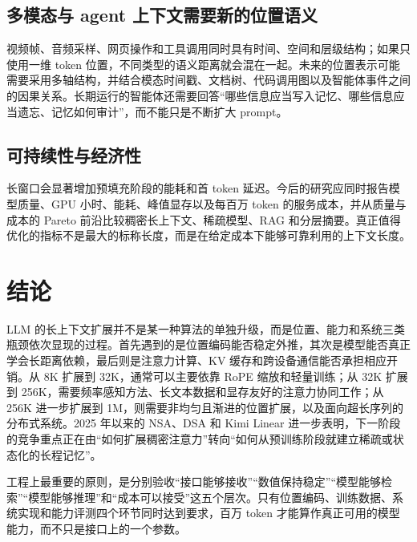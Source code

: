 \documentclass[UTF8,10pt,a4paper,fontset=none]{ctexart}
\begin{document}
\subsection{多模态与 agent 上下文需要新的位置语义}
视频帧、音频采样、网页操作和工具调用同时具有时间、空间和层级结构；如果只使用一维 token 位置，不同类型的语义距离就会混在一起。未来的位置表示可能需要采用多轴结构，并结合模态时间戳、文档树、代码调用图以及智能体事件之间的因果关系。长期运行的智能体还需要回答“哪些信息应当写入记忆、哪些信息应当遗忘、记忆如何审计”，而不能只是不断扩大 prompt。

\subsection{可持续性与经济性}
长窗口会显著增加预填充阶段的能耗和首 token 延迟。今后的研究应同时报告模型质量、GPU 小时、能耗、峰值显存以及每百万 token 的服务成本，并从质量与成本的 Pareto 前沿比较稠密长上下文、稀疏模型、RAG 和分层摘要。真正值得优化的指标不是最大的标称长度，而是在给定成本下能够可靠利用的上下文长度。

\section{结论}
LLM 的长上下文扩展并不是某一种算法的单独升级，而是位置、能力和系统三类瓶颈依次显现的过程。首先遇到的是位置编码能否稳定外推，其次是模型能否真正学会长距离依赖，最后则是注意力计算、KV 缓存和跨设备通信能否承担相应开销。从 8K 扩展到 32K，通常可以主要依靠 RoPE 缩放和轻量训练；从 32K 扩展到 256K，需要频率感知方法、长文本数据和显存友好的注意力协同工作；从 256K 进一步扩展到 1M，则需要非均匀且渐进的位置扩展，以及面向超长序列的分布式系统。2025 年以来的 NSA、DSA 和 Kimi Linear 进一步表明，下一阶段的竞争重点正在由“如何扩展稠密注意力”转向“如何从预训练阶段就建立稀疏或状态化的长程记忆”。

工程上最重要的原则，是分别验收“接口能够接收”“数值保持稳定”“模型能够检索”“模型能够推理”和“成本可以接受”这五个层次。只有位置编码、训练数据、系统实现和能力评测四个环节同时达到要求，百万 token 才能算作真正可用的模型能力，而不只是接口上的一个参数。
\end{document}

